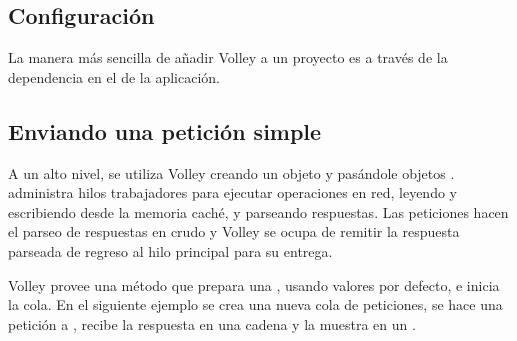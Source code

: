 \subsection*{Configuración}
\label{\detokenize{dev_docs:id2}}
La manera más sencilla de añadir Volley a un proyecto es a través de la dependencia
en el  de la aplicación.

%
\begin{sphinxVerbatim}[commandchars=\\\{\}]
 
 
\end{sphinxVerbatim}


\subsection*{Enviando una petición simple}
\label{\detokenize{dev_docs:enviando-una-peticion-simple}}
A un alto nivel, se utiliza Volley creando un objeto  y
pasándole objetos .  administra hilos trabajadores
para ejecutar operaciones en red, leyendo y escribiendo desde la memoria caché, y
parseando respuestas. Las peticiones hacen el parseo de respuestas en crudo
y Volley se ocupa de remitir la respuesta parseada de regreso al hilo principal
para su entrega.

Volley provee una método  que prepara una
, usando valores por defecto, e inicia la cola. En
el siguiente ejemplo se crea una nueva cola de peticiones,
se hace una petición  a , recibe la respuesta
en una cadena y la muestra en un .

